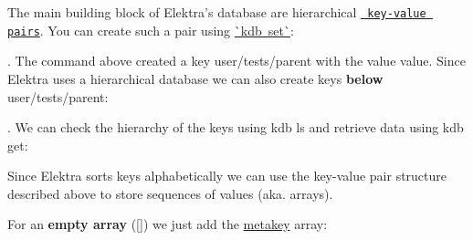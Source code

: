 The main building block of Elektra’s database are hierarchical \href{https://en.wikipedia.org/wiki/Key-value_database}{\texttt{ key-\/value pairs}}. You can create such a pair using \mbox{\hyperlink{doc_help_kdb-set_md}{\`{}kdb set\`{}}}\+:


\begin{DoxyCode}{0}
\end{DoxyCode}


. The command above created a key {\ttfamily user/tests/parent} with the value {\ttfamily value}. Since Elektra uses a hierarchical database we can also create keys {\bfseries{below}} {\ttfamily user/tests/parent}\+:


\begin{DoxyCode}{0}
\DoxyCodeLine{}
\DoxyCodeLine{}
\end{DoxyCode}


. We can check the hierarchy of the keys using {\ttfamily kdb ls} and retrieve data using {\ttfamily kdb get}\+:


\begin{DoxyCode}{0}
\DoxyCodeLine{}
\DoxyCodeLine{\#>}
\end{DoxyCode}


Since Elektra sorts keys alphabetically we can use the key-\/value pair structure described above to store sequences of values (aka. arrays).

For an {\bfseries{empty array}} ({\ttfamily \mbox{[}\mbox{]}}) we just add the \mbox{\hyperlink{doc_help_elektra-metadata_md}{metakey}} {\ttfamily array}\+:

